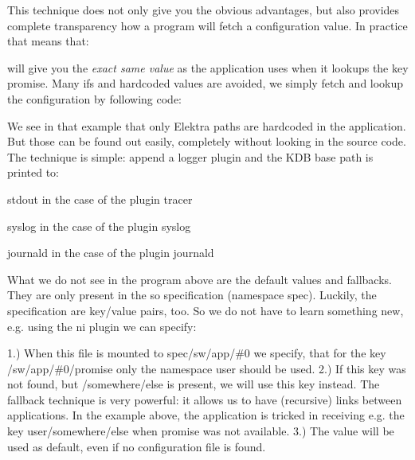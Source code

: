 This technique does not only give you the obvious advantages, but also provides complete transparency how a program will fetch a configuration value. In practice that means that\+: 


will give you the {\itshape exact same value} as the application uses when it lookups the key {\ttfamily promise}. Many {\ttfamily if}s and hardcoded values are avoided, we simply fetch and lookup the configuration by following code\+: 


We see in that example that only Elektra paths are hardcoded in the application. But those can be found out easily, completely without looking in the source code. The technique is simple\+: append a logger plugin and the K\+D\+B base path is printed to\+:


\begin{DoxyItemize}
\item stdout in the case of the plugin tracer
\item syslog in the case of the plugin syslog
\item journald in the case of the plugin journald
\end{DoxyItemize}

What we do not see in the program above are the default values and fallbacks. They are only present in the so specification (namespace {\ttfamily spec}). Luckily, the specification are key/value pairs, too. So we do not have to learn something new, e.\+g. using the ni plugin we can specify\+: 


1.) When this file is mounted to {\ttfamily spec/sw/app/\#0} we specify, that for the key {\ttfamily /sw/app/\#0/promise} only the namespace {\ttfamily user} should be used. 2.) If this key was not found, but {\ttfamily /somewhere/else} is present, we will use this key instead. The {\ttfamily fallback} technique is very powerful\+: it allows us to have (recursive) links between applications. In the example above, the application is tricked in receiving e.\+g. the key {\ttfamily user/somewhere/else} when {\ttfamily promise} was not available. 3.) The value {} will be used as default, even if no configuration file is found.

